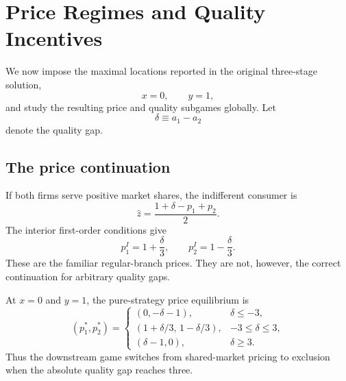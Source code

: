\section{Price Regimes and Quality Incentives}\label{sec:results}

We now impose the maximal locations reported in the original three-stage solution,
\[
 x=0,\qquad y=1,
\]
and study the resulting price and quality subgames globally. Let
\[
 \delta\equiv a_1-a_2
\]
denote the quality gap.

\subsection{The price continuation}\label{subsec:price}

If both firms serve positive market shares, the indifferent consumer is
\begin{equation}\label{eq:zhat-max}
 \hat z=\frac{1+\delta-p_1+p_2}{2}.
\end{equation}
The interior first-order conditions give
\begin{equation}\label{eq:regular-prices}
 p_1^{I}=1+\frac{\delta}{3},
 \qquad
 p_2^{I}=1-\frac{\delta}{3}.
\end{equation}
These are the familiar regular-branch prices. They are not, however, the correct continuation for arbitrary quality gaps.

\begin{lemma}\label{lem:price}
At $x=0$ and $y=1$, the pure-strategy price equilibrium is
\begin{equation}\label{eq:price-piecewise}
 (p_1^*,p_2^*)=
 \begin{cases}
 (0,-\delta-1), & \delta\leq -3,\\[1mm]
 \left(1+\delta/3,\,1-\delta/3\right), & -3\leq\delta\leq 3,\\[1mm]
 (\delta-1,0), & \delta\geq 3.
 \end{cases}
\end{equation}
Thus the downstream game switches from shared-market pricing to exclusion when the absolute quality gap reaches three.
\end{lemma}

